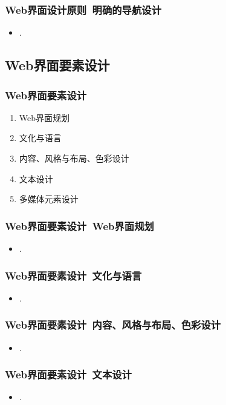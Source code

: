 \documentclass{beamer}
\begin{document}
\begin{frame}
	\frametitle{Web界面设计原则~{\small 明确的导航设计}}
	\beamertemplatetransparentcovereddynamicmedium
	\begin{itemize}[<+->]
		\item .
	\end{itemize}
\end{frame}

\subsection{Web界面要素设计}
\begin{frame}
	\frametitle{Web界面要素设计}
	\beamertemplatetransparentcovereddynamicmedium
	\begin{enumerate}[<+->]
		\item Web界面规划
		\item 文化与语言
		\item 内容、风格与布局、色彩设计
		\item 文本设计
		\item 多媒体元素设计
	\end{enumerate}
\end{frame}

\begin{frame}
	\frametitle{Web界面要素设计~{\small Web界面规划}}
	\beamertemplatetransparentcovereddynamicmedium
	\begin{itemize}[<+->]
		\item .
	\end{itemize}
\end{frame}

\begin{frame}
	\frametitle{Web界面要素设计~{\small 文化与语言}}
	\beamertemplatetransparentcovereddynamicmedium
	\begin{itemize}[<+->]
		\item .
	\end{itemize}
\end{frame}

\begin{frame}
	\frametitle{Web界面要素设计~{\small 内容、风格与布局、色彩设计}}
	\beamertemplatetransparentcovereddynamicmedium
	\begin{itemize}[<+->]
		\item .
	\end{itemize}
\end{frame}

\begin{frame}
	\frametitle{Web界面要素设计~{\small 文本设计}}
	\beamertemplatetransparentcovereddynamicmedium
	\begin{itemize}[<+->]
		\item .
	\end{itemize}
\end{frame}
\end{document}
